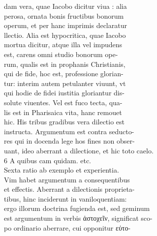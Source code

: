 \documentclass{article}
\begin{document}
\begin{pages}
                dam vera, quae Iacobo dicitur viua : alia \\
                perosa, ornata bonis fructibus bonorum \\
                operum, et per hanc imprimis declaratur \\
                llectio. Alia est hypocritica, quae Iacobo \\
                mortua dicitur, atque illa vel impudens \\
                est, carens omni studio bonorum ope- \\
                rum, qualis est in prophanis Christianis, \\
                qui de fide, hoc est, professione glorian- \\
                tur: interim autem petulanter viuunt, vt \\
                qui hodie de fidei iustitia gloriantur dis- \\
                solute viuentes. Vel est fuco tecta, qua- \\
                lis est in Pharisaica vita, hanc remouet \\
                hic. His tribus gradibus vera dilectio est \\
                instructa. Argumentum est contra seducto- \\
                res qui in docenda lege hos fines non obser- \\
                uant, ideo aberrant a dilectione, et hic toto caelo. \\
                6 A quibus cam quidam. etc. \\
                Sexta ratio ab exemplo et experientia. \\
                Vim habet argumentum a consequentibus \\
                et effectis. Aberrant a dilectionis proprieta- \\
                tibus, hinc inciderunt in vaniloquentiam: \\
                ergo illorum doctrina fugienda est, sed geminum \\
                est argumentum in verbis ἀστοχεῖν, significat sco- \\
                po ordinario aberrare, cui opponitur εὐτο- \\

\end{pages}
\end{document}
